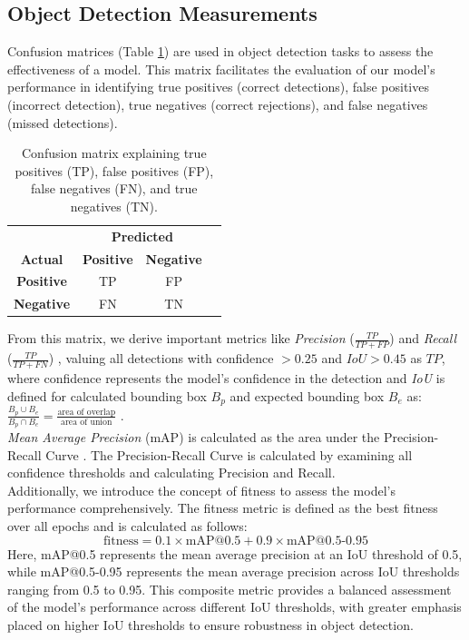 \documentclass[sigchi,screen]{acmart}
\begin{document}
\subsection{Object Detection Measurements}

Confusion matrices (Table \ref{tab:confusion_matrix}) are used in object detection tasks to assess the effectiveness of a model. This matrix facilitates the evaluation of our model's performance in identifying true positives (correct detections), false positives (incorrect detection), true negatives (correct rejections), and false negatives (missed detections).

\begin{table}[htbp]
  \centering
  \begin{tabular}{@{}cccc@{}}
    & \multicolumn{2}{c}{\textbf{Predicted}} \\ \cmidrule(l){2-3} 
    \textbf{Actual} & \textbf{Positive} & \textbf{Negative} \\ \midrule
    \textbf{Positive} & TP & FP \\
    \textbf{Negative} & FN & TN \\ \bottomrule
  \end{tabular}
  \caption{Confusion matrix explaining true positives (TP), false positives (FP), false negatives (FN), and true negatives (TN).}
  \label{tab:confusion_matrix}
\end{table}
From this matrix, we derive important metrics like \textit{Precision} ($\frac{TP}{TP +FP}$) and \textit{Recall} ($\frac{TP}{TP +FN}$) \citep{aghdam2017guide}, valuing all detections with confidence $>0.25$ and $IoU > 0.45$ as $TP$, where confidence represents the model's confidence in the detection and \textit{IoU} is defined for calculated bounding box $B_p$ and expected bounding box $B_e$ as: $\frac{B_p \cup B_e}{B_p \cap B_e} = \frac{\text{area of overlap}}{\text{area of union}}$ \citep{szeliski2022computer}. \\
\textit{Mean Average Precision} (mAP) is calculated as the area under the Precision-Recall Curve \citep{everingham2010pascal}. The Precision-Recall Curve is calculated by examining all confidence thresholds and calculating Precision and Recall. \\
Additionally, we introduce the concept of fitness to assess the model's performance comprehensively. The fitness metric is defined as the best fitness over all epochs and is calculated as follows:
\[ \text{fitness} = 0.1 \times \text{mAP@0.5} + 0.9 \times \text{mAP@0.5-0.95} \] Here, mAP@0.5 represents the mean average precision at an IoU threshold of 0.5, while mAP@0.5-0.95 represents the mean average precision across IoU thresholds ranging from 0.5 to 0.95. This composite metric provides a balanced assessment of the model's performance across different IoU thresholds, with greater emphasis placed on higher IoU thresholds to ensure robustness in object detection.
\end{document}
